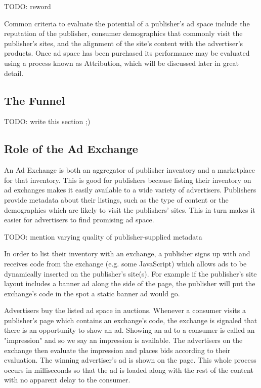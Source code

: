 \documentclass{article}
\begin{document}
TODO: reword

Common criteria to evaluate the potential of a publisher's ad space include the reputation of the publisher, consumer demographics that commonly visit the publisher's sites, and the alignment of the site's content with the advertiser's products. Once ad space has been purchased its performance may be evaluated using a process known as Attribution, which will be discussed later in great detail.

\subsection{The Funnel}

TODO: write this section ;)

\subsection{Role of the Ad Exchange}

An Ad Exchange is both an aggregator of publisher inventory and a marketplace for that inventory. This is good for publishers because listing their inventory on ad exchanges makes it easily available to a wide variety of advertisers. Publishers provide metadata about their listings, such as the type of content or the demographics which are likely to visit the publishers' sites. This in turn makes it easier for advertisers to find promising ad space.

TODO: mention varying quality of publisher-supplied metadata

In order to list their inventory with an exchange, a publisher signs up with and receives code from the exchange (e.g. some JavaScript) which allows ads to be dynamically inserted on the publisher's site(s). For example if the publisher's site layout includes a banner ad along the side of the page, the publisher will put the exchange's code in the spot a static banner ad would go.

Advertisers buy the listed ad space in auctions. Whenever a consumer visits a publisher's page which contains an exchange's code, the exchange is signaled that there is an opportunity to show an ad. Showing an ad to a consumer is called an "impression" and so we say an impression is available. The advertisers on the exchange then evaluate the impression and places bids according to their evaluation. The winning advertiser's ad is shown on the page. This whole process occurs in milliseconds so that the ad is loaded along with the rest of the content with no apparent delay to the consumer.
\end{document}
